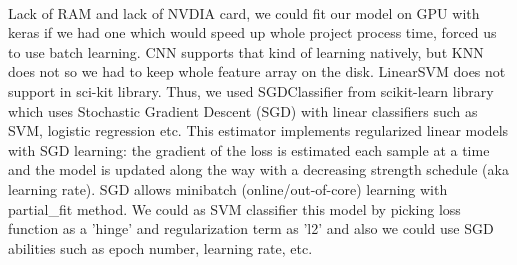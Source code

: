 \documentclass[10pt,twocolumn,letterpaper]{article}
\begin{document}
  \paragraph{} Lack of RAM and lack of NVDIA card, we could fit our model on GPU with keras if we had one which would speed up whole project process time, forced us to use batch learning. CNN supports that kind of learning natively, but KNN does not so we had to keep whole feature array on the disk. LinearSVM does not support in sci-kit library. Thus, we used SGDClassifier from scikit-learn library which uses Stochastic Gradient Descent (SGD) with linear classifiers such as SVM, logistic regression etc. This estimator implements regularized linear models with SGD learning: the gradient of the loss is estimated each sample at a time and the model is updated along the way with a decreasing strength schedule (aka learning rate). SGD allows minibatch (online/out-of-core) learning with partial\_fit method. We could as SVM classifier this model by picking loss function as a 'hinge' and regularization term as 'l2' and also we could use SGD abilities such as epoch number, learning rate, etc. 
  
\end{document}
